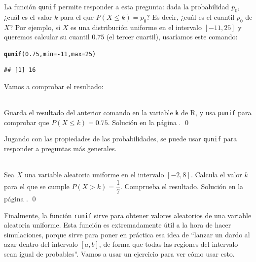 \documentclass[10pt,a4paper]{article}\usepackage[]{graphicx}\usepackage[]{color}
\makeatletter
\newcommand{\hlnum}[1]{\textcolor[rgb]{0.686,0.059,0.569}{#1}}%
\newcommand{\hlopt}[1]{\textcolor[rgb]{0,0,0}{#1}}%
\newcommand{\hlstd}[1]{\textcolor[rgb]{0.345,0.345,0.345}{#1}}%
\newcommand{\hlkwc}[1]{\textcolor[rgb]{0.333,0.667,0.333}{#1}}%
\newcommand{\hlkwd}[1]{\textcolor[rgb]{0.737,0.353,0.396}{\textbf{#1}}}%
\newenvironment{kframe}{%
 \def\at@end@of@kframe{}%
 \ifinner\ifhmode%
  \def\at@end@of@kframe{\end{minipage}}%
  \begin{minipage}{\columnwidth}%
 \fi\fi%
 \def\FrameCommand##1{\hskip\@totalleftmargin \hskip-\fboxsep
 \colorbox{shadecolor}{##1}\hskip-\fboxsep
     \hskip-\linewidth \hskip-\@totalleftmargin \hskip\columnwidth}%
 \MakeFramed {\advance\hsize-\width
   \@totalleftmargin\z@ \linewidth\hsize
   \@setminipage}}%
 {\par\unskip\endMakeFramed%
 \at@end@of@kframe}
\newenvironment{knitrout}{}{} %
\makeatother
\begin{document}
La función {\tt qunif} permite responder a esta pregunta: dada la probabilidad $p_0$, ¿cuál es el valor $k$ para el que $P(X\leq k) = p_0$? Es decir, ¿cuál es el cuantil $p_0$ de $X$? Por ejemplo, si $X$ es una distribución uniforme en el intervalo $[-11, 25]$ y queremos calcular su cuantil $0.75$ (el tercer cuartil), usaríamos este comando:
\begin{knitrout}
\color{fgcolor}\begin{kframe}
\begin{alltt}
\hlkwd{qunif}\hlstd{(}\hlnum{0.75}\hlstd{,} \hlkwc{min}\hlstd{=}\hlopt{-}\hlnum{11}\hlstd{,} \hlkwc{max}\hlstd{=}\hlnum{25}\hlstd{)}
\end{alltt}
\begin{verbatim}
## [1] 16
\end{verbatim}
\end{kframe}
\end{knitrout}
Vamos a comprobar el resultado:
\begin{ejercicio}
\label{tut05:ejercicio18}
\quad\\
Guarda el resultado del anterior comando en la variable {\tt k} de R, y usa {\tt punif} para comprobar que $P(X\leq k) = 0.75$.
Solución en la página \pageref{tut05:ejercicio18:sol}.
\qed
\end{ejercicio}

Jugando con las propiedades de las probabilidades, se puede usar {\tt qunif} para responder a preguntas más generales.
\begin{ejercicio}
\label{tut05:ejercicio19}
\quad\\
Sea $X$ una variable aleatoria uniforme en el intervalo $[-2, 8]$. Calcula el valor $k$ para el que se cumple $P(X > k) = \dfrac{1}{7}$. Comprueba el resultado. Solución en la página \pageref{tut05:ejercicio19:sol}.
\qed
\end{ejercicio}

Finalmente, la función {\tt runif} sirve para obtener valores aleatorios de una variable aleatoria uniforme. Esta función es extremadamente útil a la hora de hacer simulaciones, porque sirve para poner en práctica esa idea de {``lanzar un dardo al azar dentro del intervalo $[a, b]$, de forma que todas las regiones del intervalo sean igual de probables''.} Vamos a usar un ejercicio para ver cómo usar esto.
\end{document}
